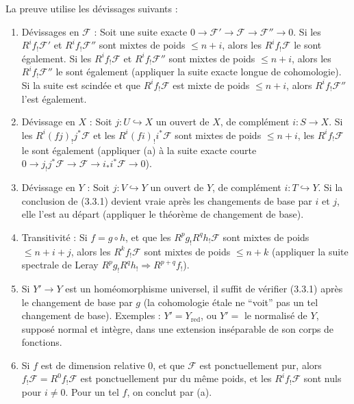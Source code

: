 \documentclass[12pt,a4paper]{article}
\theoremstyle{plain}
\theoremstyle{definition}
\theoremstyle{remark}
\begin{document}
La preuve utilise les d\'evissages suivants :
\begin{enumerate}[label=\alph*)]
\item D\'evissages en $\mathscr{F}$ : Soit une suite exacte $0 \to \mathscr{F}' \to \mathscr{F} \to \mathscr{F}'' \to 0$. Si les $R^i f_! \mathscr{F}'$ et $R^i f_! \mathscr{F}''$ sont mixtes de poids $\leq n + i$, alors les $R^i f_! \mathscr{F}$ le sont \'egalement. Si les $R^i f_! \mathscr{F}$ et $R^i f_! \mathscr{F}''$ sont mixtes de poids $\leq n + i$, alors les $R^i f_! \mathscr{F}''$ le sont \'egalement (appliquer la suite exacte longue de cohomologie). Si la suite est scind\'ee et que $R^i f_! \mathscr{F}$ est mixte de poids $\leq n + i$, alors $R^i f_! \mathscr{F}''$ l'est \'egalement.
\item D\'evissage en $X$ : Soit $j : U \hookrightarrow X$ un ouvert de $X$, de compl\'ement $i : S \to X$. Si les $R^i (fj)_! j^*\mathscr{F}$ et les $R^i (fi)_! i^*\mathscr{F}$ sont mixtes de poids $\leq n + i$, les $R^i f_! \mathscr{F}$ le sont \'egalement (appliquer (a) \`a la suite exacte courte $0 \to j_!j^*\mathscr{F} \to \mathscr{F} \to i_*i^*\mathscr{F} \to 0$).
\item D\'evissage en $Y$ : Soit $j : V \hookrightarrow Y$ un ouvert de $Y$, de compl\'ement $i : T \hookrightarrow Y$. Si la conclusion de (3.3.1) devient vraie apr\`es les changements de base par $i$ et $j$, elle l'est au d\'epart (appliquer le th\'eor\`eme de changement de base).
\item Transitivit\'e : Si $f = g \circ h$, et que les $R^p g_! R^q h_! \mathscr{F}$ sont mixtes de poids $\leq n + i + j$, alors les $R^k f_! \mathscr{F}$ sont mixtes de poids $\leq n + k$ (appliquer la suite spectrale de Leray $R^p g_! R^q h_! \Rightarrow R^{p+q} f_!$).
\item Si $Y' \to Y$ est un hom\'eomorphisme universel, il suffit de v\'erifier (3.3.1) apr\`es le changement de base par $g$ (la cohomologie \'etale ne ``voit'' pas un tel changement de base). Exemples : $Y' = Y_{\text{red}}$, ou $Y' =$ le normalis\'e de $Y$, suppos\'e normal et int\`egre, dans une extension ins\'eparable de son corps de fonctions.
\item Si $f$ est de dimension relative $0$, et que $\mathscr{F}$ est ponctuellement pur, alors $f_! \mathscr{F} = R^0 f_! \mathscr{F}$ est ponctuellement pur du m\^eme poids, et les $R^i f_! \mathscr{F}$ sont nuls pour $i \neq 0$. Pour un tel $f$, on conclut par (a).
\end{enumerate}
\end{document}
